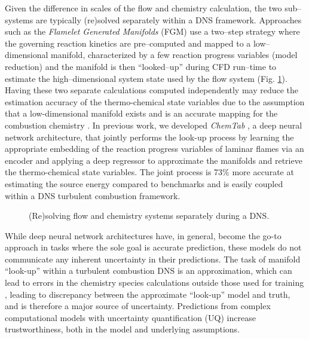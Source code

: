 \documentclass[conf]{new-aiaa}
\begin{document}
Given the difference in scales of the flow and chemistry calculation,  the two sub--systems are typically (re)solved separately within a DNS framework. Approaches such as the {\em Flamelet Generated Manifolds} (FGM) use a two--step strategy where the governing reaction kinetics are pre--computed and mapped to a low--dimensional manifold, characterized by a few reaction progress variables (model reduction) and the manifold is then ``looked--up'' during CFD run--time to estimate the high--dimensional system state used by the flow system (Fig. \ref{fig:reduced}). Having these two separate calculations computed independently may reduce the estimation accuracy of the thermo-chemical state variables due to the assumption that a low-dimensional manifold exists and is an accurate mapping for the combustion chemistry \cite{maaspope92}. In previous work, we developed \textit{ChemTab} \cite{chemtab1.0}, a deep neural network architecture, that jointly performs the look-up process by learning the appropriate embedding of the reaction progress variables of laminar flames via an encoder and applying a deep regressor to approximate the manifolds and retrieve the thermo-chemical state variables. The joint process is 73$\%$ more accurate at estimating the source energy compared to benchmarks and is easily coupled within a DNS turbulent combustion framework. 

\begin{figure}[H]
\begin{center}
  
  \caption{(Re)solving flow and chemistry systems separately during a DNS.}
  \label{fig:reduced}
\end{center}
\end{figure}





While deep neural network architectures have, in general, become the go-to approach in tasks where the sole goal is accurate prediction, these models do not communicate any inherent uncertainty in their predictions. The task of manifold ``look-up'' within a turbulent combustion DNS is an approximation, which can lead to errors in the chemistry species calculations outside those used for training \cite{biogas}, leading to discrepancy between the approximate ``look-up'' model and truth, and is therefore a major source of uncertainty. Predictions from complex computational models with uncertainty quantification (UQ) increase trustworthiness, both in the model and underlying assumptions. 
\end{document}

